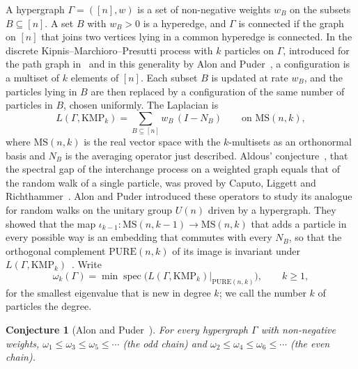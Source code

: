 \documentclass[11pt]{amsart}
\newtheorem{conj}[thm]{Conjecture}
\theoremstyle{remark}
\numberwithin{equation}{section}
\newcommand{\PURE}{\mathrm{PURE}}
\newcommand{\MS}{\mathrm{MS}}
\newcommand{\KMP}{\mathrm{KMP}}
\DeclareMathOperator{\spec}{spec}
\begin{document}
A hypergraph $\Gamma=([n],w)$ is a set of non-negative weights $w_B$ on the subsets $B\subseteq[n]$. A set $B$ with $w_B>0$ is a hyperedge, and $\Gamma$ is connected if the graph on $[n]$ that joins two vertices lying in a common hyperedge is connected. In the discrete Kipnis--Marchioro--Presutti process with $k$ particles on $\Gamma$, introduced for the path graph in~\cite{KMP82} and in this generality by Alon and Puder~\cite[Definition~1.12]{AP26}, a configuration is a multiset of $k$ elements of $[n]$. Each subset $B$ is updated at rate $w_B$, and the particles lying in $B$ are then replaced by a configuration of the same number of particles in $B$, chosen uniformly. The Laplacian is
\[
L(\Gamma,\KMP_k)=\sum_{B\subseteq[n]}w_B\,(I-N_B)\qquad\text{on }\MS(n,k),
\]
where $\MS(n,k)$ is the real vector space with the $k$-multisets as an orthonormal basis and $N_B$ is the averaging operator just described. Aldous' conjecture~\cite{Ald92}, that the spectral gap of the interchange process on a weighted graph equals that of the random walk of a single particle, was proved by Caputo, Liggett and Richthammer~\cite{CLR10}. Alon and Puder introduced these operators to study its analogue for random walks on the unitary group $U(n)$ driven by a hypergraph. They showed that the map $\iota_{k-1}\colon\MS(n,k-1)\to\MS(n,k)$ that adds a particle in every possible way is an embedding that commutes with every $N_B$, so that the orthogonal complement $\PURE(n,k)$ of its image is invariant under $L(\Gamma,\KMP_k)$~\cite[Proposition~3.13]{AP26}. Write
\[
\omega_k(\Gamma)=\min\spec\bigl(L(\Gamma,\KMP_k)|_{\PURE(n,k)}\bigr),\qquad k\ge1,
\]
for the smallest eigenvalue that is new in degree $k$; we call the number $k$ of particles the degree.

\begin{conj}[{Alon and Puder~\cite[Conjecture~4.16]{AP26}}]\label{conj:AP}
For every hypergraph $\Gamma$ with non-negative weights, $\omega_1\le\omega_3\le\omega_5\le\cdots$ (the odd chain) and $\omega_2\le\omega_4\le\omega_6\le\cdots$ (the even chain).
\end{conj}
\end{document}
